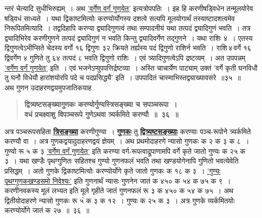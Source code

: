 \documentclass[11pt, openany]{book}
\begin{document}
\newpage

\begin{sloppypar}
\noindent न्तरं चेत्यादि सुधीभिरुह्यम्~। अथ \hyperref[4.34]{'वर्गेण वर्गं गुणयेत्'} इत्यत्रोपपतिः~। इह हि करणीषड्विधेन तन्मूलयोरेव षड्विधं साध्यते~। यथा द्विकाष्टमित्योः करण्योर्योगस्य दशत्वे सत्यपि मूलयोगार्थं तस्याष्टादशत्वमेव निरूपितमित्यादि~। तद्वदिहापि करण्या द्व्यादिगुणत्वं तथा सम्पादनीयं यथा तत्पदं द्व्यादिगुणं भवति~। तत्र द्व्यादिभिरेव करणीगुणने तत्पदं द्व्यादिगुणं न भवति किन्तु द्व्यादिवर्गेण तद्गुणने~। यथा राशिः ४~। एतस्य द्विगुणत्वेऽभीप्सिते चेदस्य वर्गो १६ द्विगुणः ३२ क्रियते तर्ह्यस्य पदं द्विगुणो राशिर्न भवति~। राशि\textendash \,४\textendash \,वर्गे १६ द्विवर्गेण ४ गुणिते तु ६४ तत्पदं ८ भवति द्विगुणो राशिः~। एवं त्र्यादिगुणत्वेऽपि द्रष्टव्यम्~। अत उपपन्नम् \hyperref[4.34]{'वर्गेण वर्गं गुणयेत्'} इति~। एवं भजनेऽप्युपपत्तिर्द्रष्टव्या~। अस्ति चाचार्येण {\color{violet}पाट्याम्} उक्तं {\color{violet}'वर्गे कृती घनविधौ तु घनौ विधेयौ हारांशयोरपि पदे च पदप्रसिद्ध्यै'} इति~। उपपादितं चास्माभिस्तद्व्याख्यावसरे~॥३५~॥\\

{\small अथ गुणन उदाहरणद्वयमुपजातिकयाह\textendash }

 \label{4.36}
\begin{quote}
{\large \textbf{{\color{purple}द्वित्र्यष्टसङ्ख्यागुणकः करण्योर्गुण्यस्त्रिसङ्ख्या च सपञ्चरूपा~।\\
वधं प्रचक्ष्वाशु विपञ्चरूपे गुणेऽथवा त्र्यर्कमिते करण्यौ~॥~३६~॥}}}
\end{quote}

अत्र पञ्चरूपसहिता \hyperref[4.36]{\textbf{त्रिसङ्ख्या}} करणीगुण्या~। \hyperref[4.36]{\textbf{गुणकः}} तु \hyperref[4.36]{\textbf{द्वित्र्यष्टसङ्ख्याः}} करण्याः पञ्च-रूपोने त्र्यर्कमिते करण्यौ वा~। अत्र गुणकद्वयादुदाहरणद्वयं ज्ञेयम्~। अथ प्रथमोदाहरणे न्यासो गुणकः क २ क ३ क ८~। गुण्यो रू ५ क ३ \hyperref[4.34]{'वर्गेण वर्गं गुणयेत्'} इति करण्या वर्ग-रूपत्वाद्रूपाणामपि वर्गे कृते जातो गुण्यः क २५ क ३~। यथा खण्डैः पृथग्गुणितः सहितश्च गुण्यो गुणनफलं भवति तथा खण्डयोगेनापि गुणितो भवत्येवेति प्रसिद्धम्~। अतो गुणके द्विकाष्टमित्योः करण्योर्योगे कृते जातो गुणकः क १८ क ३~। \hyperref[3.27.1]{'गुण्यः पृथग्गुणकखण्डसमो निवेश्यः'} इति गुणनार्थं न्यासः\textendash {}\; गुणनेन जातं क ४५० क ५४ क ७५ क ९~। करणीनवकस्य मूलं लभ्यत इति मूले गृहीते जातं गुणनफलं रू ३ क ४५० क ५४ क ७५~। अथ द्वितीयोदाहरणे न्यासो गुणकः रू ५ं क ३ क १२~। गुण्यः क २५ क ३~। अत्र गुणके व्यर्कमितयोः करण्योर्योगे जातं क २७~॥~३६~॥ \\


\end{sloppypar}
\end{document}
